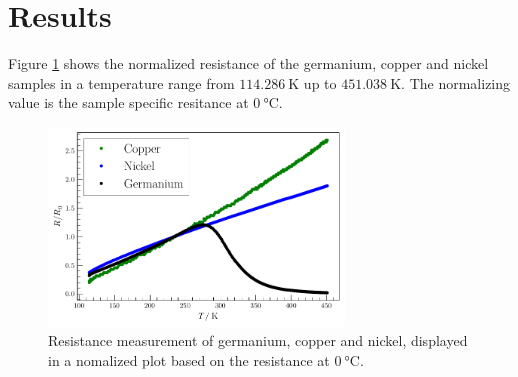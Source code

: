 


\section{Results}
\label{sec:Results}

Figure \ref{fig:comparison} shows the normalized resistance of the germanium, copper and nickel samples in a temperature range from $\SI{114.286}{\kelvin}$ up to $\SI{451.038}{\kelvin}$.
The normalizing value is the sample specific resitance at $\SI{0}{\celsius}$.

\begin{figure}
    \captionsetup{width=0.9\linewidth}
    \includegraphics[width=0.7\textwidth]{plots/compare.pdf}
  \caption{Resistance measurement of germanium, copper and nickel, displayed in a nomalized plot based on the resistance at $\SI{0}{\celsius}$.}
    \label{fig:comparison}
\end{figure}

